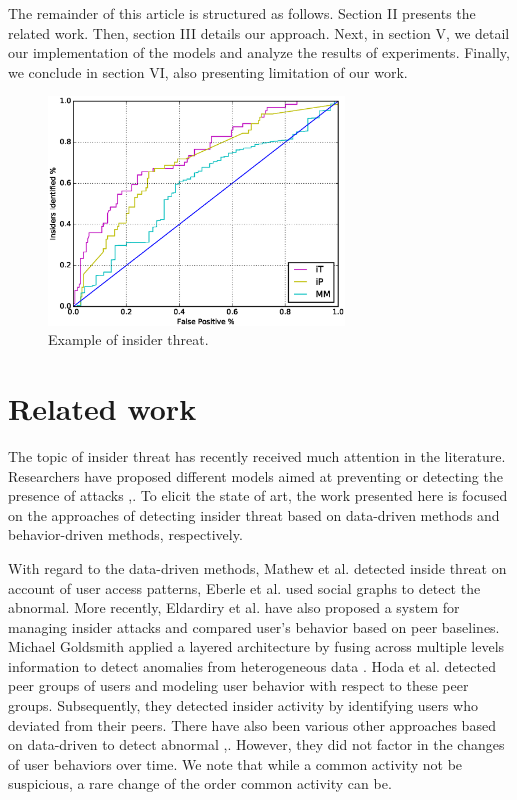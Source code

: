 \documentclass[conference]{IEEEtran}
\begin{document}
The remainder of this article is structured as follows. 
Section II presents the related work.
Then, section III details our approach. Next, in section V, 
we detail our implementation of the models and analyze the results of experiments. 
Finally, we conclude in section VI, also presenting limitation of our work.

\begin{figure}[htb]
\centerline{\includegraphics[width = 0.7\textwidth]{figure/figure1.eps}}
\caption{Example of insider threat.}
\label{fig}
\end{figure}


\section{Related work}
The topic of insider threat has recently received much attention in the literature. Researchers have proposed different models aimed at preventing or detecting the presence of attacks  \cite{b11},\cite{b12}. To elicit the state of art, the work
presented here is focused on the approaches of detecting insider threat based on data-driven methods and behavior-driven methods, respectively.

With regard to the data-driven methods, Mathew et al. \cite{b13} detected inside threat on account of user access patterns, Eberle et al. \cite{b14} used social graphs to detect the abnormal. More recently, Eldardiry et al. \cite{b15} have also proposed a system for managing insider attacks and compared user’s behavior based on peer baselines.
Michael Goldsmith applied a layered architecture by fusing across multiple levels information to detect anomalies from heterogeneous data \cite{b16}. Hoda et al. \cite{b13} detected peer groups of users and modeling user behavior with respect to these peer groups. Subsequently, they detected insider activity by identifying users who deviated from their peers. 
There have also been various other approaches based on data-driven to detect abnormal \cite{b10},\cite{b8}. 
However, they did not factor in the changes of user behaviors over time. We note that while a common activity not be suspicious, a rare change of the order common activity can be. 
\end{document}
